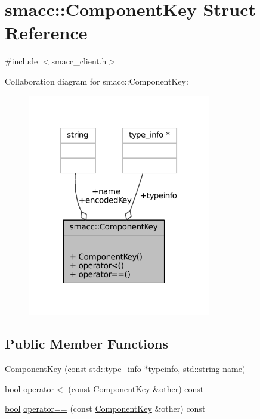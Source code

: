 \hypertarget{structsmacc_1_1ComponentKey}{}\section{smacc\+:\+:Component\+Key Struct Reference}
\label{structsmacc_1_1ComponentKey}


{\ttfamily \#include $<$smacc\+\_\+client.\+h$>$}



Collaboration diagram for smacc\+:\+:Component\+Key\+:
\nopagebreak
\begin{figure}[H]
\begin{center}
\leavevmode
\includegraphics[width=227pt]{structsmacc_1_1ComponentKey__coll__graph}
\end{center}
\end{figure}
\subsection*{Public Member Functions}
\begin{DoxyCompactItemize}
\item 
\hyperlink{structsmacc_1_1ComponentKey_a72c4c29bb7126f5f688a049419cbf0f1}{Component\+Key} (const std\+::type\+\_\+info $\ast$\hyperlink{structsmacc_1_1ComponentKey_a148bab7ba01039d4bcabfd93529b333a}{typeinfo}, std\+::string \hyperlink{structsmacc_1_1ComponentKey_ad38f21bde4dad1dd3c143bdc42e6f30d}{name})
\item 
\hyperlink{classbool}{bool} \hyperlink{structsmacc_1_1ComponentKey_ab1841870c99bfce85e7a4e219c309bc3}{operator$<$} (const \hyperlink{structsmacc_1_1ComponentKey}{Component\+Key} \&other) const 
\item 
\hyperlink{classbool}{bool} \hyperlink{structsmacc_1_1ComponentKey_ab57708d5b2635aacf857e2dc1eb67b08}{operator==} (const \hyperlink{structsmacc_1_1ComponentKey}{Component\+Key} \&other) const 
\end{DoxyCompactItemize}
